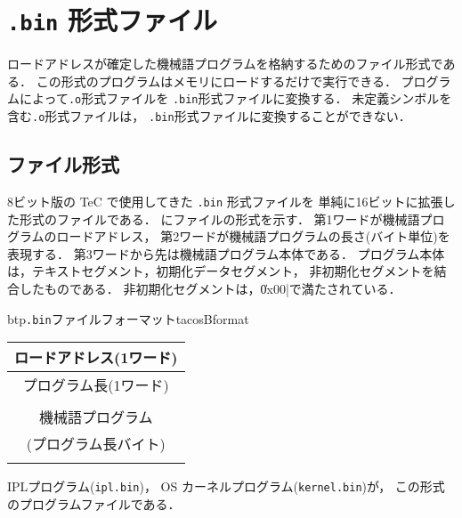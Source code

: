 \section{\texttt{.bin} 形式ファイル}
ロードアドレスが確定した機械語プログラムを格納するためのファイル形式である．
この形式のプログラムはメモリにロードするだけで実行できる．
{\objbin}プログラムによって\texttt{.o}形式ファイルを
\texttt{.bin}形式ファイルに変換する．
未定義シンボルを含む\texttt{.o}形式ファイルは，
\texttt{.bin}形式ファイルに変換することができない．

\subsection{ファイル形式}
8ビット版の TeC で使用してきた \texttt{.bin} 形式ファイルを
単純に16ビットに拡張した形式のファイルである．
にファイルの形式を示す．
第1ワードが機械語プログラムのロードアドレス，
第2ワードが機械語プログラムの長さ(バイト単位)を表現する．
第3ワードから先は機械語プログラム本体である．
プログラム本体は，テキストセグメント，初期化データセグメント，
非初期化セグメントを結合したものである．
非初期化セグメントは，\|0x00|で満たされている．

\begin{myfig}{btp}{\texttt{.bin}ファイルフォーマット}{tacosBformat}
  \begin{tabular}{|c|}
    \hline
    ロードアドレス(1ワード) \\\hline
    プログラム長(1ワード) \\\hline
    \\
    機械語プログラム \\
    (プログラム長バイト)\\
    \\\hline
  \end{tabular}
\end{myfig}

IPLプログラム(\texttt{ipl.bin})，
OS カーネルプログラム(\texttt{kernel.bin})が，
この形式のプログラムファイルである．
